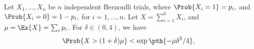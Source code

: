 \begin{lemma}
        Let $X_1, \ldots, X_n$ be $n$ independent Bernoulli trials, where
        \begin{math}
            \Prob{  X_i = 1 } =p_i,
        \end{math}
        and
        \begin{math}
            \Prob{  X_i = 0 } =1- p_i,
        \end{math}
        for $i=1,\ldots, n$.  Let $X = \sum_{i=1}^{b} X_i$, and
        $\mu = \Ex{\bigl. X} = \sum_i p_i$.  For $\delta \in (0,4)$,
        we have
        \begin{equation*}
            \Prob{ \bigl. X > (1+\delta)\mu } < \exp \pth{-\mu \delta^2 /
               4},
        \end{equation*}
    \end{lemma}

